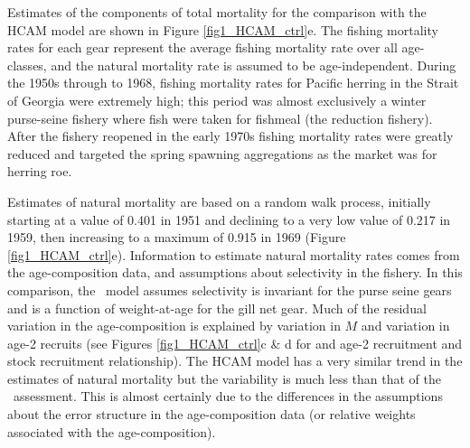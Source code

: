 Estimates of the components of total mortality for the comparison with the HCAM model are shown in Figure \ref{fig1_HCAM_ctrl}e.  The fishing mortality rates for each gear represent the average fishing mortality rate over all age-classes, and the natural mortality rate is assumed to be age-independent.  During the 1950s through to 1968, fishing mortality rates for Pacific herring in the Strait of Georgia were extremely high; this period was almost exclusively a winter purse-seine fishery where fish were taken for fishmeal (the reduction fishery).  After the fishery reopened in the early 1970s fishing mortality rates were greatly reduced and targeted the spring spawning aggregations as the market was for herring roe. 

Estimates of natural mortality are based on a random walk process, initially starting at a value of 0.401 in 1951 and declining to a very low value of 0.217 in 1959, then increasing to a maximum of 0.915 in 1969 (Figure \ref{fig1_HCAM_ctrl}e).  Information to estimate natural mortality rates comes from the age-composition data, and assumptions about selectivity in the fishery.  In this comparison, the \iscam\ model assumes selectivity is invariant for the purse seine gears and is a function of weight-at-age for the gill net gear. Much of the residual variation in the age-composition is explained by variation in $M$ and variation in age-2 recruits (see Figures \ref{fig1_HCAM_ctrl}c \& d for and age-2 recruitment and stock recruitment relationship).  The HCAM model has a very similar trend in the estimates of natural mortality but the variability is much less than that of the \iscam\ assessment.  This is almost certainly due to the differences in the assumptions about the error structure in the age-composition data (or relative weights associated with the age-composition).




